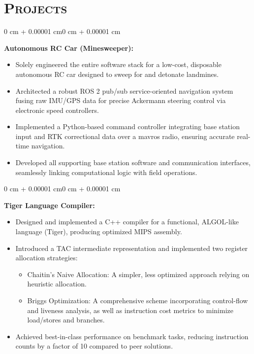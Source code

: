 \documentclass[11pt, letterpaper]{article}
\newenvironment{highlights}{
    \begin{itemize}[
        topsep=0.10 cm,
        parsep=0.10 cm,
        partopsep=0pt,
        itemsep=0pt,
        leftmargin=0.4 cm + 10pt
    ]
}{
    \end{itemize}
}
\newenvironment{onecolentry}{
    \begin{adjustwidth}{0 cm + 0.00001 cm}{0 cm + 0.00001 cm}
}{
    \end{adjustwidth}
}
\begin{document}
\section{\scshape Projects}

\vspace{0.2 cm}

\begin{onecolentry}
    \textbf{Autonomous RC Car (Minesweeper):}
    \begin{highlights}
        \item Solely engineered the entire software stack for a low-cost, disposable autonomous RC car designed to sweep for and detonate landmines.
        \item Architected a robust ROS 2 pub/sub service-oriented navigation system fusing raw IMU/GPS data for precise Ackermann steering control via electronic speed controllers.
        \item Implemented a Python-based command controller integrating base station input and RTK correctional data over a mavros radio, ensuring accurate real-time navigation.
        \item Developed all supporting base station software and communication interfaces, seamlessly linking computational logic with field operations.
    \end{highlights}
\end{onecolentry}

\vspace{0.4 cm}

\begin{onecolentry}
    \textbf{Tiger Language Compiler:}
    \begin{highlights}
        \item Designed and implemented a C++ compiler for a functional, ALGOL-like language (Tiger), producing optimized MIPS assembly.
        \item Introduced a TAC intermediate representation and implemented two register allocation strategies:
            \begin{itemize}[leftmargin=15pt]
                \item Chaitin's Naive Allocation: A simpler, less optimized approach relying on heuristic allocation.
                \item Briggs Optimization: A comprehensive scheme incorporating control-flow and liveness analysis, as well as instruction cost metrics to minimize load/stores and branches.
            \end{itemize}
        \item Achieved best-in-class performance on benchmark tasks, reducing instruction counts by a factor of 10 compared to peer solutions.
    \end{highlights}
\end{onecolentry}
\end{document}
